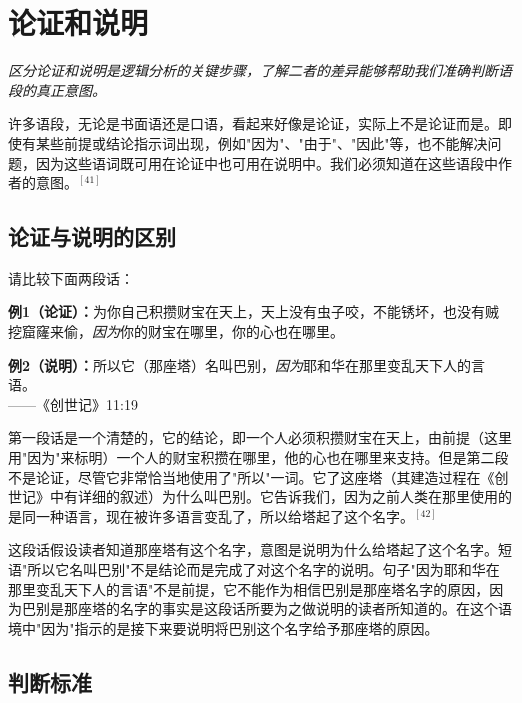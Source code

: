 \section{论证和说明}

\begin{logicbox}[title=引言]
\textit{区分论证和说明是逻辑分析的关键步骤，了解二者的差异能够帮助我们准确判断语段的真正意图。}
\end{logicbox}

许多语段，无论是书面语还是口语，看起来好像是论证，实际上不是论证而是。即使有某些前提或结论指示词出现，例如"因为"、"由于"、"因此"等，也不能解决问题，因为这些语词既可用在论证中也可用在说明中。我们必须知道在这些语段中作者的意图。$^{[41]}$

\subsection{论证与说明的区别}

请比较下面两段话：

\begin{examplebox}[title=论证与说明的对比]
\textbf{例1（论证）：}为你自己积攒财宝在天上，天上没有虫子咬，不能锈坏，也没有贼挖窟窿来偷，\textit{因为}你的财宝在哪里，你的心也在哪里。

\textbf{例2（说明）：}所以它（那座塔）名叫巴别，\textit{因为}耶和华在那里变乱天下人的言语。\\
——《创世记》11:19
\end{examplebox}

第一段话是一个清楚的，它的结论，即一个人必须积攒财宝在天上，由前提（这里用"因为"来标明）一个人的财宝积攒在哪里，他的心也在哪里来支持。但是第二段不是论证，尽管它非常恰当地使用了"所以"一词。它了这座塔（其建造过程在《创世记》中有详细的叙述）为什么叫巴别。它告诉我们，因为之前人类在那里使用的是同一种语言，现在被许多语言变乱了，所以给塔起了这个名字。$^{[42]}$

这段话假设读者知道那座塔有这个名字，意图是说明为什么给塔起了这个名字。短语"所以它名叫巴别"不是结论而是完成了对这个名字的说明。句子"因为耶和华在那里变乱天下人的言语"不是前提，它不能作为相信巴别是那座塔名字的原因，因为巴别是那座塔的名字的事实是这段话所要为之做说明的读者所知道的。在这个语境中"因为"指示的是接下来要说明将巴别这个名字给予那座塔的原因。

\subsection{判断标准}


